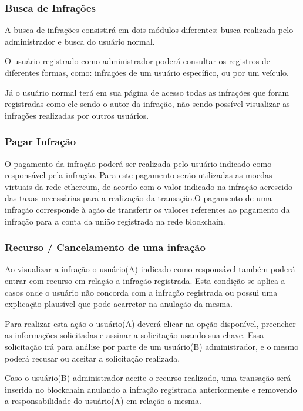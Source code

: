     \subsubsection{Busca de Infrações}
    
        A busca de infrações consistirá em dois módulos diferentes: busca realizada pelo administrador e busca do usuário normal.
        
        O usuário registrado como administrador poderá consultar os registros de diferentes formas, como: infrações de um usuário específico, ou por um veículo.
        
        Já o usuário normal terá em sua página de acesso todas as infrações que foram registradas como ele sendo o autor da infração, não sendo possível visualizar as infrações realizadas por outros usuários.
    
    \subsubsection{Pagar Infração}
    
        O pagamento da infração poderá ser realizada pelo usuário indicado como responsável pela infração. Para este pagamento serão utilizadas as moedas virtuais da rede ethereum, de acordo com o valor indicado na infração acrescido das taxas necessárias para a realização da transação.O pagamento de uma infração corresponde à ação de transferir os valores referentes ao pagamento da infração para a conta da união registrada na rede blockchain.
    
    
    \subsubsection{Recurso / Cancelamento de uma infração}
    
        Ao visualizar a infração o usuário(A) indicado como responsável também poderá entrar com recurso em relação a infração registrada. Esta condição se aplica a casos onde o usuário não concorda com a infração registrada ou possui uma explicação plausível que pode acarretar na anulação da mesma.
        
        Para realizar esta ação o usuário(A) deverá clicar na opção disponível, preencher as informações solicitadas e assinar a solicitação usando sua chave. Essa solicitação irá para análise por parte de um usuário(B) administrador, e o mesmo poderá recusar ou aceitar a solicitação realizada.
        
        Caso o usuário(B) administrador aceite o recurso realizado, uma transação será inserida no blockchain anulando a infração registrada anteriormente e removendo a responsabilidade do usuário(A) em relação a mesma.
        
